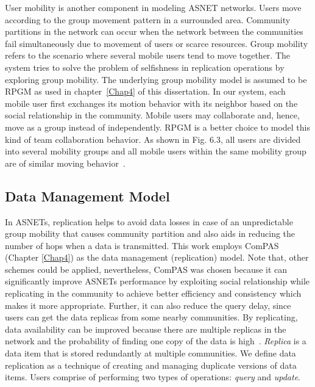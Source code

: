 User mobility is another component in modeling ASNET networks. Users move according to the group movement pattern in a surrounded area. Community partitions in the network can occur when the network between the communities fail simultaneously due to movement of users or scarce resources. Group mobility refers to the scenario where several mobile users tend to move together. The system tries to solve the problem of selfishness in replication operations by exploring group mobility. The underlying group mobility model is assumed to be RPGM as used in chapter~\ref{Chap4} of this dissertation. In our system, each mobile user first exchanges its motion behavior with its neighbor based on the social relationship in the community. Mobile users may collaborate and, hence, move as a group instead of independently. RPGM is a better choice to model this kind of team collaboration behavior. As shown in Fig. 6.3, all users are divided into several mobility groups and all mobile users within the same mobility group are of similar moving behavior~\cite{AMAhmed2014}.

\subsection{Data Management Model}\label{Chap6_03_02}
In ASNETs, replication helps to avoid data losses in case of an unpredictable group mobility that causes community partition and also aids in reducing the number of hops when a data is transmitted. This work employs ComPAS (Chapter \ref{Chap4}) as the data management (replication) model. Note that, other schemes could be applied, nevertheless, ComPAS was chosen because it can significantly improve ASNETs performance by exploiting social relationship while replicating in the community to achieve better efficiency and consistency which makes it more appropriate. Further, it can also reduce the query delay, since users can get the data replicas from some nearby communities. By replicating, data availability can be improved because there are multiple replicas in the network and the probability of finding one copy of the data is high~\cite{ADerhab2009}. {\it Replica} is a data item that is stored redundantly at multiple communities. We define data replication as a technique of creating and managing duplicate versions of data items. Users comprise of performing two types of operations: {\it query} and {\it update}.


